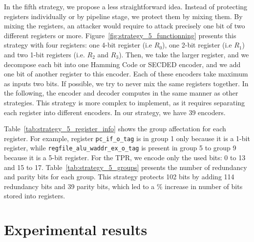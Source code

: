 In the fifth strategy, we propose a less straightforward idea. Instead of protecting registers individually or by pipeline stage, we protect them by mixing them. By mixing the registers, an attacker would require to attack precisely one bit of two different registers or more. Figure~\ref{fig:strategy_5_functionning} presents this strategy with four registers: one 4-bit register (i.e $R_0$), one 2-bit register (i.e $R_1$) and two 1-bit registers (i.e. $R_2$ and $R_3$). Then, we take the larger register, and we decompose each bit into one Hamming Code or SECDED encoder, and we add one bit of another register to this encoder. Each of these encoders take maximum as inputs two bits. If possible, we try to never mix the same registers together. In the following, the encoder and decoder computes in the same manner as other strategies. This strategy is more complex to implement, as it requires separating each register into different encoders. In our strategy, we have 39 encoders.

Table~\ref{tab:strategy_5_register_info} shows the group affectation for each register. For example, register \texttt{pc\_if\_o\_tag} is in group 1 only because it is a 1-bit register, while \texttt{regfile\_alu\_waddr\_ex\_o\_tag} is present in group 5 to group 9 because it is a 5-bit register. For the TPR, we encode only the used bits: 0 to 13 and 15 to 17.
Table~\ref{tab:strategy_5_groups} presents the number of redundancy and parity bits for each group. This strategy protects 102 bits by adding 114 redundancy bits and 39 parity bits, which led to a \% increase in number of bits stored into registers.

\section{Experimental results}
\label{section:chap6_evaluation}

